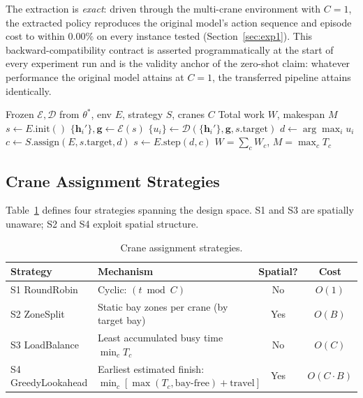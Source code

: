 \documentclass[11pt,a4paper]{elsarticle}
\begin{document}
The extraction is \emph{exact}: driven through the multi-crane environment with $C=1$, the extracted policy reproduces the original model's action sequence and episode cost to within $0.00\%$ on every instance tested (Section~\ref{sec:exp1}). This backward-compatibility contract is asserted programmatically at the start of every experiment run and is the validity anchor of the zero-shot claim: whatever performance the original model attains at $C=1$, the transferred pipeline attains identically.

\begin{algorithm}[h!]
    \caption{Zero-shot M-CRP inference.}
    \label{alg:zs}
    \begin{algorithmic}[1]
        \Require Frozen $\mathcal{E},\mathcal{D}$ from $\theta^\ast$, env $E$, strategy $S$, cranes $C$
        \Ensure Total work $W$, makespan $M$
        \State $s\gets E.\text{init}()$
            \State $\{\mathbf{h}_i'\},\mathbf{g}\gets\mathcal{E}(s)$
            \State $\{u_i\}\gets\mathcal{D}(\{\mathbf{h}_i'\},\mathbf{g},s.\text{target})$
            \State $d\gets\arg\max_i u_i$
            \State $c\gets S.\text{assign}(E,s.\text{target},d)$
            \State $s\gets E.\text{step}(d,c)$ 
        \EndWhile
        \State \Return $W = \sum_c W_c$, \; $M = \max_c T_c$
    \end{algorithmic}
\end{algorithm}

\subsection{Crane Assignment Strategies}

Table~\ref{tab:strategies} defines four strategies spanning the design space. S1 and S3 are spatially unaware; S2 and S4 exploit spatial structure.

\begin{table}[h!]
    \centering
    \caption{Crane assignment strategies.}
    \label{tab:strategies}
    \begin{tabularx}{\textwidth}{lXcc}
        \toprule
        Strategy & Mechanism & Spatial? & Cost \\
        \midrule
        S1 RoundRobin & Cyclic: $(t\bmod C)$ & No & $O(1)$ \\
        S2 ZoneSplit & Static bay zones per crane (by target bay) & Yes & $O(B)$ \\
        S3 LoadBalance & Least accumulated busy time $\min_c T_c$ & No & $O(C)$ \\
        S4 GreedyLookahead & Earliest estimated finish: $\min_c [\max(T_c, \text{bay-free}) + \text{travel}]$ & Yes & $O(C \cdot B)$ \\
        \bottomrule
    \end{tabularx}
\end{table}
\end{document}
